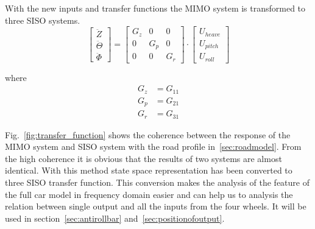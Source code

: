  With the new inputs and transfer functions the \ac{MIMO} system is transformed to three \ac{SISO} systems.
 \begin{equation}
     \begin{bmatrix}
     \ddot{Z}\\
     \ddot{\Theta}\\
     \ddot{\Phi}
     \end{bmatrix}=
     \begin{bmatrix}
     G_z & 0 & 0\\
     0 & G_p & 0\\
     0 & 0 & G_r
     \end{bmatrix} \cdot
     \begin{bmatrix}
     U_{heave}\\
     U_{pitch}\\
     U_{roll}
     \end{bmatrix}
 \end{equation}
 
 where 
 \begin{align}
     G_{z}& = G_{11}\\
     G_{p}& = G_{21}\\
     G_{r}& = G_{31}
 \end{align}
 
 
 Fig.~\ref{fig:transfer_function} shows the coherence between the response of the \ac{MIMO} system and \ac{SISO} system with the road profile in~\ref{sec:roadmodel}.
 From the high coherence it is obvious that the results of two systems are almost identical.
 With this method state space representation has been converted to three \ac{SISO} transfer function.
 This conversion makes the analysis of the feature of the full car model in frequency domain easier and can help us to analysis the relation between single output and all the inputs from the four wheels.
 It will be used in section~\ref{sec:antirollbar} and~\ref{sec:positionofoutput}.
 

